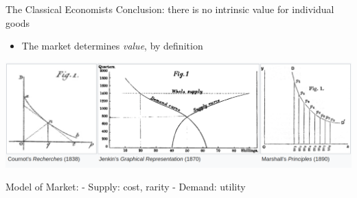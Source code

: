 \begin{frame}{The Classical Economists}
\protect\hypertarget{the-classical-economists-2}{}
Conclusion: there is no intrinsic value for individual goods

\begin{itemize}
\tightlist
\item
  The market determines \emph{value}, by definition
\end{itemize}

\includegraphics{demand_supply.png}

Model of Market: - Supply: cost, rarity - Demand: utility
\end{frame}

